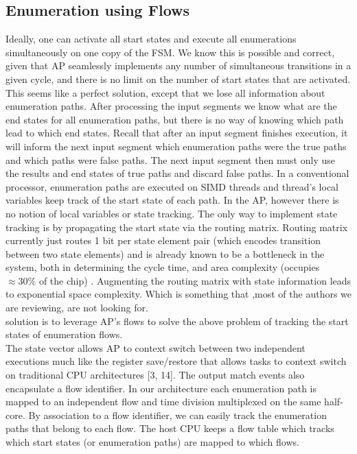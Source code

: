 \subsection{Enumeration using Flows}
Ideally, one can activate all start states and execute all enumerations simultaneously on one copy of the FSM. We know this is possible
and correct, given that AP seamlessly implements any number of
simultaneous transitions in a given cycle, and there is no limit on the
number of start states that are activated. This seems like a perfect
solution, except that we lose all information about enumeration paths.
After processing the input segments we know what are the end states
for all enumeration paths, but there is no way of knowing which path
lead to which end states. Recall that after an input segment finishes
execution, it will inform the next input segment which enumeration
paths were the true paths and which paths were false paths. The next
input segment then must only use the results and end states of true
paths and discard false paths.
In a conventional processor, enumeration paths are executed on
SIMD threads and thread’s local variables keep track of the start state
of each path. In the AP, however there is no notion of local variables
or state tracking. The only way to implement state tracking is by
propagating the start state via the routing matrix. Routing matrix
currently just routes 1 bit per state element pair (which encodes
transition between two state elements) and is already known to be a
bottleneck in the system, both in determining the cycle time, and area
complexity (occupies $≈30\%$ of the chip) \cite{}. Augmenting the routing
matrix with state information leads to exponential space complexity.
Which is something that ,most of the authors we are reviewing, are not looking for.\\
\cite{} solution is to leverage  AP's flows to solve the above problem of tracking the start states of enumeration flows.\\
The state vector allows AP
to context switch between two independent executions much like the
register save/restore that allows tasks to context switch on traditional
CPU architectures [3, 14]. The output match events also encapsulate
a flow identifier.
In our architecture each enumeration path is mapped to an independent flow and time division multiplexed on the same half-core.
By association to a flow identifier, we can easily track the enumeration paths that belong to each flow. The host CPU keeps a flow table
which tracks which start states (or enumeration paths) are mapped
to which flows.

